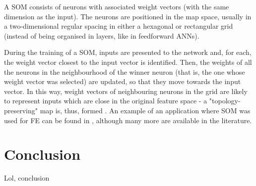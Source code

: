 \documentclass[9pt,journal,compsoc]{IEEEtran}
\begin{document}
A SOM consists of neurons with associated weight vectors (with the same dimension as the input). The neurons are positioned in the map space, usually in a two-dimensional regular spacing in either a hexagonal or rectangular grid (instead of being organised in layers, like in feedforward ANNs).

During the training of a SOM, inputs are presented to the network and, for each, the weight vector closest to the input vector is identified. Then, the weights of all the neurons in the neighbourhood of the winner neuron (that is, the one whose weight vector was selected) are updated, so that they move towards the input vector. In this way, weight vectors of neighbouring neurons in the grid are likely to represent inputs which are close in the original feature space - a "topology-preserving" map is, thus, formed \cite{kohonen1995self, villmann1997topology}. An example of an application where SOM was used for FE can be found in \cite{lawrence1997face}, although many more are available in the literature.

\section{Conclusion}\label{sec:conclusion}

Lol, conclusion



\end{document}
